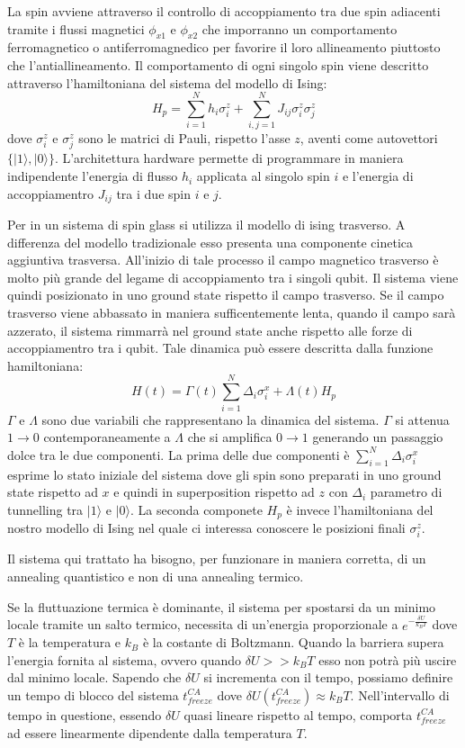 La  spin avviene attraverso il controllo di accoppiamento tra due spin adiacenti tramite i flussi magnetici $\phi_{x1}$ e $\phi_{x2}$ che imporranno un comportamento ferromagnetico o antiferromagnedico per favorire il loro allineamento piuttosto che l'antiallineamento.
Il comportamento di ogni singolo spin viene descritto attraverso l'hamiltoniana del sistema del modello di Ising:
$$H_p = \sum_{i=1}^N h_i \sigma_i^z + \sum_{i,j=1}^N J_{ij} \sigma_i^z \sigma_j^z$$
dove $\sigma_i^z$ e $\sigma_j^z$ sono le matrici di Pauli, rispetto l'asse $z$, aventi come autovettori $\{|1\rangle, |0\rangle\}$. L'architettura hardware permette di programmare in maniera indipendente l'energia di flusso $h_i$ applicata al singolo spin $i$ e l'energia di accoppiamentro $J_{ij}$ tra i due spin $i$ e $j$.

Per  in un sistema di spin glass si utilizza il modello di ising trasverso. A differenza del modello tradizionale esso presenta una componente cinetica aggiuntiva trasversa. All'inizio di tale processo il campo magnetico trasverso è molto più grande del legame di accoppiamento tra i singoli qubit. Il sistema viene quindi posizionato in uno ground state rispetto il campo trasverso. Se il campo trasverso viene abbassato in maniera sufficentemente lenta, quando il campo sarà azzerato, il sistema rimmarrà nel ground state anche rispetto alle forze di accoppiamentro tra i qubit. Tale dinamica può essere descritta dalla funzione hamiltoniana:
$$H(t) = \Gamma(t) \sum_{i=1}^N \Delta_i \sigma_i^x + \Lambda(t) H_p$$
$\Gamma$ e $\Lambda$ sono due variabili che rappresentano la dinamica del sistema. $\Gamma$ si attenua $1 \to 0$ contemporaneamente a $\Lambda$ che si amplifica $0 \to 1$ generando un passaggio dolce tra le due componenti. La prima delle due componenti è $\sum_{i=1}^N \Delta_i \sigma_i^x$ esprime lo stato iniziale del sistema dove gli spin sono preparati in uno ground state rispetto ad $x$ e quindi in superposition rispetto ad $z$ con $\Delta_i$ parametro di tunnelling tra $|1\rangle$ e $|0\rangle$. La seconda componete $H_p$ è invece l'hamiltoniana del nostro modello di Ising nel quale ci interessa conoscere le posizioni finali $\sigma_i^z$.

\cite{QAS}Il sistema qui trattato ha bisogno, per funzionare in maniera corretta, di un annealing quantistico e non di una annealing termico.

Se la fluttuazione termica è dominante, il sistema per spostarsi da un minimo locale tramite un salto termico, necessita di un'energia proporzionale a $e^{-\frac{\delta U}{k_B T}}$ dove $T$ è la temperatura e $k_B$ è la costante di Boltzmann.
Quando la barriera supera l'energia fornita al sistema, ovvero quando $\delta U >> k_B T$ esso non potrà più uscire dal minimo locale. Sapendo che $\delta U$ si incrementa con il tempo, possiamo definire un tempo di blocco del sistema $t_{freeze}^{CA}$ dove $\delta U(t_{freeze}^{CA}) \approx k_BT$. Nell'intervallo di tempo in questione, essendo $\delta U$ quasi lineare rispetto al tempo, comporta $t_{freeze}^{CA}$ ad essere linearmente dipendente dalla temperatura $T$.

